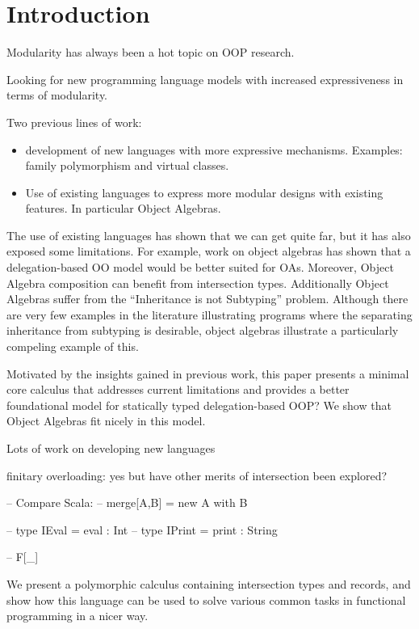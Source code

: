 \section{Introduction}

Modularity has always been a hot topic on OOP research. 

Looking for new programming language models with increased
expressiveness in terms of modularity. 

Two previous lines of work: 

\begin{itemize}

\item development of new languages with more 
expressive mechanisms. Examples: family polymorphism and virtual
classes.

\item Use of existing languages to express more modular designs 
with existing features. In particular Object Algebras. 

\end{itemize} 

The use of existing languages has shown that we can get quite far, but 
it has also exposed some limitations. For example, work on object
algebras has shown that a delegation-based OO model would be better 
suited for OAs. Moreover, Object Algebra composition can benefit from 
intersection types. Additionally Object Algebras suffer from the
``Inheritance is not Subtyping'' problem. Although there are very few
examples in the literature illustrating programs where the separating 
inheritance from subtyping is desirable, object algebras illustrate a 
particularly compeling example of this. 

Motivated by the insights gained in previous work, this paper presents 
a minimal core calculus that addresses current limitations and
provides a better foundational model for statically typed
delegation-based OOP? We show that Object Algebras fit nicely in this
model. 


Lots of work on developing new languages 

finitary overloading: yes
but have other merits of intersection been explored?

-- Compare Scala:
-- merge[A,B] = new A with B

-- type IEval  = { eval :  Int }
-- type IPrint = { print : String }

-- F[\_]

We present a polymorphic calculus containing intersection types and records, and show
how this language can be used to solve various common tasks in functional
programming in a nicer way.

